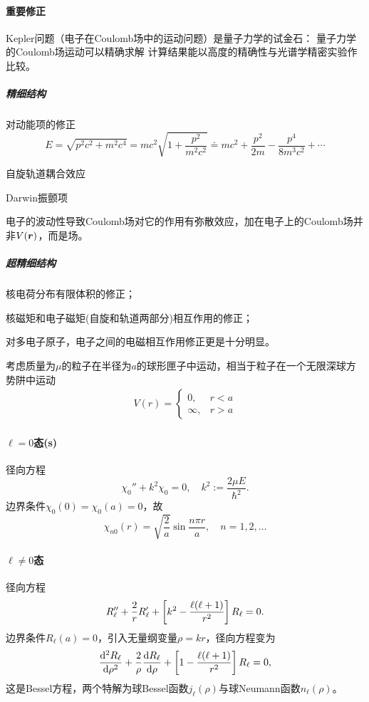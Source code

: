 \paragraph*{重要修正}
Kepler问题（电子在Coulomb场中的运动问题）是量子力学的试金石：
量子力学的Coulomb场运动可以精确求解
计算结果能以高度的精确性与光谱学精密实验作比较。
\subparagraph*{精细结构}
\begin{compactenum}
	\item 对动能项的修正
	\[
		E=\sqrt{p^2c^2+m^2c^4}=mc^2\sqrt{1+\frac{p^2}{m^2c^2}}\doteq mc^2+\frac{p^2}{2m}-\frac{p^4}{8m^3c^2}+\cdots
	\]
	\item 自旋轨道耦合效应
	\item Darwin振颤项

	电子的波动性导致Coulomb场对它的作用有弥散效应，加在电子上的Coulomb场并非$V(\r)$，而是场。
\end{compactenum}
\subparagraph*{超精细结构}
\begin{compactenum}
	\item 核电荷分布有限体积的修正；
	\item 核磁矩和电子磁矩(自旋和轨道两部分)相互作用的修正；
	\item 对多电子原子，电子之间的电磁相互作用修正更是十分明显。
\end{compactenum}
考虑质量为$\mu$的粒子在半径为$a$的球形匣子中运动，相当于粒子在一个无限深球方势阱中运动
\begin{align*}
	V(r)=\begin{cases}
		0, & r<a \\[
	-1ex]\infty,&r>a
	\end{cases}
\end{align*}
\paragraph*{$\ell=0$态(s)}径向方程
\[
	\chi_0''+k^2\chi_0=0,\quad k^2:=\frac{2\mu E}{\hbar^2}.
\]
边界条件$\chi_0(0)=\chi_0(a)=0$，故 
\[
	\chi_{n0}(r)=\sqrt{\frac2a}\sin\frac{n\pi r}a,\quad n=1,2,\ldots
\]
\paragraph*{$\ell\neq 0$态}径向方程 
\[
	R_\ell''+\frac2rR_\ell'+\fkh{k^2-\frac{\ell(\ell+1)}{r^2}}R_\ell=0.
\]
边界条件$R_\ell(a)=0$，引入无量纲变量$\rho=kr$，径向方程变为 
\[
	\dv[2]{R_\ell}\rho+\frac2\rho\dv{R_\ell}\rho+\fkh{1-\frac{\ell(\ell+1)}{r^2}}R_\ell=0,
\]
这是Bessel方程，两个特解为球Bessel函数$j_\ell(\rho)$与球Neumann函数$n_\ell(\rho)$。

